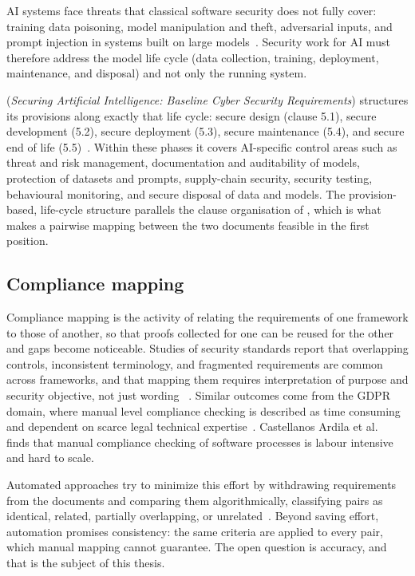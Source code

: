 AI systems face threats that classical software security does not fully cover:
training data poisoning, model manipulation and theft, adversarial inputs, and
prompt injection in systems built on large models~\cite{chen2024mlsecurity,
he2025aisecurity}. Security work for AI must therefore address the model
life cycle (data collection, training, deployment, maintenance, and
disposal) and not only the running system.

\standardB{} (\textit{Securing Artificial Intelligence: Baseline Cyber
Security Requirements}) structures its provisions along exactly that life
cycle: secure design (clause 5.1), secure development (5.2), secure deployment
(5.3), secure maintenance (5.4), and secure end of life (5.5)~\cite{etsi304223}.
Within these phases it covers AI-specific control areas such as threat and risk
management, documentation and auditability of models, protection of datasets
and prompts, supply-chain security, security testing, behavioural monitoring,
and secure disposal of data and models. The provision-based, life-cycle
structure parallels the clause organisation of \standardA{}, which is what
makes a pairwise mapping between the two documents feasible in the first
position.

\subsection{Compliance mapping}

Compliance mapping is the activity of relating the requirements of one
framework to those of another, so that proofs collected for one can be
reused for the other and gaps become noticeable. Studies of security standards
report that overlapping controls, inconsistent terminology, and fragmented
requirements are common across frameworks, and that mapping them requires
interpretation of purpose and security objective, not just wording
~\cite{djebbar2023comparative,mussmann2020mappings}. Similar outcomes come
from the GDPR domain, where manual level compliance checking is described as
time consuming and dependent on scarce legal technical
expertise~\cite{cejas2023gdpr,negri2024gdpr}. Castellanos Ardila et
al.~\cite{castellanos2022compliance} finds that manual compliance
checking of software processes is labour intensive and hard to scale.

Automated approaches try to minimize this effort by withdrawing requirements from
the documents and comparing them algorithmically, classifying pairs as
identical, related, partially overlapping, or unrelated~\cite{sleimi2021legal}.
Beyond saving effort, automation promises consistency: the same criteria are
applied to every pair, which manual mapping cannot guarantee. The open question
is accuracy, and that is the subject of this thesis.

